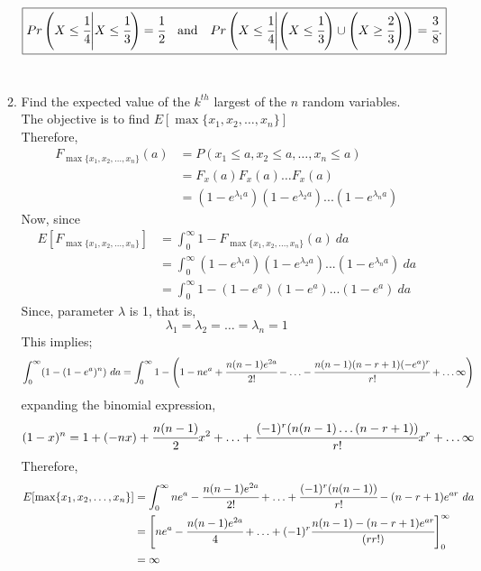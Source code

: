 \documentclass{article}
\begin{document}
\begin{enumerate}
\begin{enumerate}
        \[ 
            \boxed{Pr\left( X \leq \cfrac{1}{4} \middle| X \leq \cfrac{1}{3} \right) = \cfrac{1}{2} \quad \text{and} \quad 
            Pr\left( X \leq \cfrac{1}{4} \middle| \left( X \leq \cfrac{1}{3} \right) \cup \left( X \geq \cfrac{2}{3} \right) \right) = \cfrac{3}{8}.}
        \]\\
    \item 
        Find the expected value of the \(k^{th}\) largest of the \(n\) random variables.\\
        The objective is to find \(E[\max\{x_1,x_2,\ldots,x_n\}]\)\\
        Therefore, 
        \begin{align*}
            F_{\max\{x_1,x_2,\ldots,x_n\}}(a) &= P(x_1 \leq a, x_2 \leq a, \ldots, x_n \leq a)\\
            &= F_x(a) F_x(a) \ldots F_x(a)\\
            &= (1-e^{\lambda_1 a})(1-e^{\lambda_2 a})...(1-e^{\lambda_n a})
        \end{align*}
        Now, since
        \begin{align*}
            E\left[F_{\max\{x_1,x_2,\ldots,x_n\}}\right] &= \int_0^\infty 1 - F_{\max\{x_1,x_2,\ldots,x_n\}}(a) \ da\\
            &= \int_0^\infty (1-e^{\lambda_1 a})(1-e^{\lambda_2 a})...(1-e^{\lambda_n a}) \ da\\
            &= \int_0^\infty 1 - (1-e^{a})(1-e^{a})...(1-e^{a}) \ da
        \end{align*}
        Since, parameter \(\lambda\) is 1, that is,
        \[
            \lambda_1 = \lambda_2 = \ldots = \lambda_n = 1
        \]
        This implies;
        \[
            \int_0^\infty (1 - (1-e^{a})^n) \ da = \int_0^\infty 1 - \left(1 - ne^{a} + \cfrac{n(n-1)e^{2a}}{2!} - \ldots - \cfrac{n(n-1)(n-r+1)(-e^{a})^r}{r!} + \ldots \infty\right)
        \]
        expanding the binomial expression,
        \[
            (1-x)^n = 1 + (-nx) + \cfrac{n(n-1)}{2}x^2 + \ldots + \cfrac{(-1)^r(n(n-1)\ldots(n-r+1))}{r!}x^r + \ldots \infty
        \]
        Therefore,
        \begin{align*}
            E[\max\{x_1,x_2,\ldots,x_n\}] &= \int_0^\infty ne^{a} - \cfrac{n(n-1)e^{2a}}{2!} + \ldots + \cfrac{(-1)^r(n(n-1))}{r!} - (n-r+1)e^{ar}\ da\\
            &= \left[ne^{a} - \cfrac{n(n-1)e^{2a}}{4} + \ldots + (-1)^r\cfrac{n(n-1) - (n-r+1)e^{ar}}{(rr!)}\right]_0^\infty\\
            &= \infty
        \end{align*}

\end{enumerate}
\end{enumerate}
\end{document}
